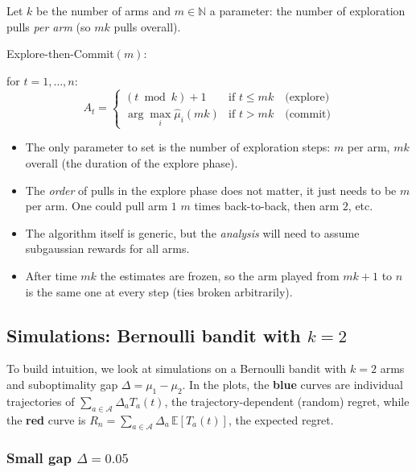 \begin{definition}
Let $k$ be the number of arms and $m \in \mathbb{N}$ a parameter: the number of exploration pulls \emph{per arm} (so $mk$ pulls overall). 

Explore-then-Commit$(m)$: 

\hspace{20pt} for $t = 1, \dots, n$:
\[
A_t = \begin{cases} (t \bmod k) + 1 & \text{if } t \leq mk \quad \text{(explore)} \\[2pt] \arg\max_i \hat{\mu}_i(mk) & \text{if } t > mk \quad \text{(commit)} \end{cases}
\]
\end{definition}

\begin{remark}
\begin{itemize}
    \item The only parameter to set is the number of exploration steps: $m$ per arm, $mk$ overall (the duration of the explore phase).
    \item The \emph{order} of pulls in the explore phase does not matter, it just needs to be $m$ per arm. One could pull arm $1$ $m$ times back-to-back, then arm $2$, etc.
    \item The algorithm itself is generic, but the \emph{analysis} will need to assume subgaussian rewards for all arms.
    \item After time $mk$ the estimates are frozen, so the arm played from $mk+1$ to $n$ is the same one at every step (ties broken arbitrarily).
\end{itemize}
\end{remark}

\subsection{Simulations: Bernoulli bandit with $k = 2$}

To build intuition, we look at simulations on a Bernoulli bandit with $k = 2$ arms and suboptimality gap $\Delta = \mu_1 - \mu_2$. In the plots, the \textbf{blue} curves are individual trajectories of $\sum_{a \in \mathcal{A}}\Delta_a T_a(t)$, the trajectory-dependent (random) regret, while the \textbf{red} curve is $R_n = \sum_{a \in \mathcal{A}}\Delta_a\,\mathbb{E}[T_a(t)]$, the expected regret.

\subsubsection*{Small gap $\Delta = 0.05$}

